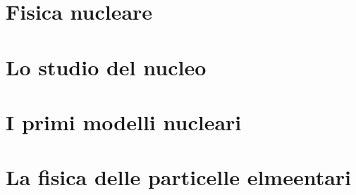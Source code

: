 \documentclass{tufte-book} %
\theoremstyle{definition}
\theoremstyle{theorem}
\theoremstyle{plain}
\theoremstyle{remark}
\theoremstyle{remark}
\begin{document}





\cleardoublepage

\cleardoublepage

\chapter{Fisica nucleare}\label{ch:fisica-nucleare}
       
\chapter{Lo studio del nucleo}\label{ch:studio-del-nucleo}

       
\chapter{I primi modelli nucleari}\label{ch:modelli-nucleari}

        
\chapter{La fisica delle particelle elmeentari}\label{ch:particelle-elementari}
\end{document}
